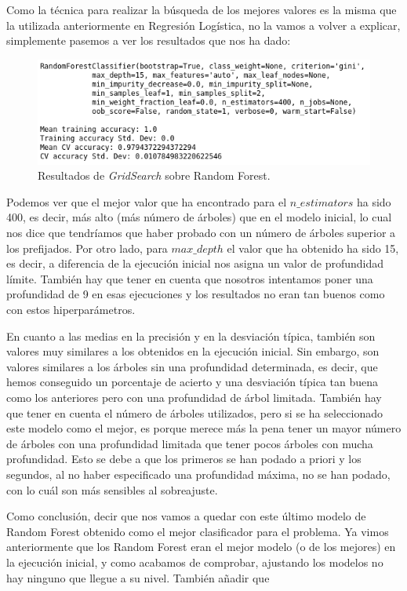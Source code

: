 \documentclass[11pt,a4paper]{article}
\begin{document}
Como la técnica para realizar la búsqueda de los mejores valores es la misma que la utilizada anteriormente en Regresión Logística, no la vamos a volver a explicar, simplemente pasemos a ver los resultados que nos ha dado:

\begin{figure}[H]
    \centering
    \includegraphics[scale=0.6]{img/gs-rf.png}
    \caption{Resultados de \textit{GridSearch} sobre Random Forest.}
    \label{fig:gs-lr}
\end{figure}

Podemos ver que el mejor valor que ha encontrado para el $n\_estimators$ ha sido 400, es decir, más alto (más número de árboles) que en el modelo inicial, lo cual nos dice que tendríamos que haber probado con un número de árboles superior a  los prefijados. Por otro lado, para $max\_depth$ el valor que ha obtenido ha sido 15, es decir, a diferencia de la ejecución inicial nos asigna un valor de profundidad límite. También hay que tener en cuenta que nosotros intentamos poner una profundidad de 9 en esas ejecuciones y los resultados no eran tan buenos como con estos hiperparámetros.

En cuanto a las medias en la precisión y en la desviación típica, también son valores muy similares a los obtenidos en la ejecución inicial. Sin embargo, son valores similares a los árboles sin una profundidad determinada, es decir, que hemos conseguido un porcentaje de acierto y una desviación típica tan buena como los anteriores pero con una profundidad de árbol limitada. También hay que tener en cuenta el número de árboles utilizados, pero si se ha seleccionado este modelo como el mejor, es porque merece más la pena tener un mayor número de árboles con una profundidad limitada que tener pocos árboles con mucha profundidad. Esto se debe a que los primeros se han podado a priori y los segundos, al no haber especificado una profundidad máxima, no se han podado, con lo cuál son más sensibles al sobreajuste.

Como conclusión, decir que nos vamos a quedar con este último modelo de Random Forest obtenido como el mejor clasificador para el problema. Ya vimos anteriormente que los Random Forest eran el mejor modelo (o de los mejores) en la ejecución inicial, y como acabamos de comprobar, ajustando los modelos no hay ninguno que llegue a su nivel. También añadir que 
\end{document}
